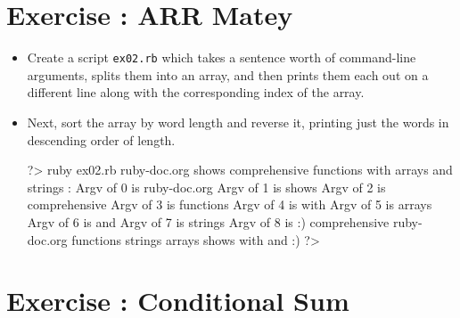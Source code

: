 \documentclass{42-en}
\begin{document}

\chapter{Exercise \exercicenumber: ARR Matey}

\exnumber{\exercicenumber}


\begin{itemize}

\item Create a script \texttt{ex02.rb} which takes a sentence worth of command-line arguments, splits them into an array, and then prints them each out on a different line along with the corresponding index of the array.
\item Next, sort the array by word length and reverse it, printing just the words in descending order of length.

\begin{42console}
	?> ruby ex02.rb ruby-doc.org shows comprehensive functions with arrays and strings :\)
	Argv of 0 is ruby-doc.org
	Argv of 1 is shows
	Argv of 2 is comprehensive
	Argv of 3 is functions
	Argv of 4 is with
	Argv of 5 is arrays
	Argv of 6 is and
	Argv of 7 is strings
	Argv of 8 is :)
	comprehensive
	ruby-doc.org
	functions
	strings
	arrays
	shows
	with
	and
	:)
	?>
\end{42console}

\end{itemize}


\chapter{Exercise \exercicenumber: Conditional Sum}
\end{document}
